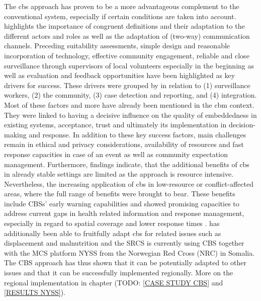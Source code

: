The \acrshort*{cbs} approach has proven to be a more advantageous complement to the conventional system, especially if certain conditions are taken into account. \autocite{gueninParticipatoryEpidemiologicalOne2022} highlights the importance of congruent definitions and their adaptation to the different actors and roles as well as the adaptation of (two-way) communication channels. Preceding suitability assessments, simple design and reasonable incorporation of technology, effective community engagement, reliable and close surveillance through supervisors of local volunteers especially in the beginning as well as evaluation and feedback opportunities have been highlighted as key drivers for success. These drivers were grouped by \autocite{mcgowanCommunitybasedSurveillanceInfectious2022} in relation to (1) surveillance workers, (2) the community, (3) case detection and reporting, and (4) integration. Most of these factors and more have already been mentioned in the \acrshort*{cbm} context. They were linked to having a decisive influence on the quality of embeddedness in existing systems, acceptance, trust and ultimately its implementation in decision-making and response. In addition to these key success factors, main challenges remain in ethical and privacy considerations, availability of resources and fast response capacities in case of an event as well as community expectation management. Furthermore, \autocite{boetzelaerEvaluationCommunityBased2020} findings indicate, that the additional benefits of \acrshort*{cbs} in already stable settings are limited as the approach is resource intensive. Nevertheless, the increasing application of \acrshort*{cbs} in low-resource or conflict-affected areas, where the full range of benefits were brought to bear. These benefits include CBSs' early warning capabilities and showed promising capacities to address current gaps in health related information and response management, especially in regard to spatial coverage and lower response times \autocite{metugeHumanitarianLedCommunitybased2021, ratnayakePeoplecentredSurveillanceNarrative2020}. \autocite{metugeHumanitarianLedCommunitybased2021} has additionally been able to fruitfully adapt \acrshort*{cbs} for related issues such as displacement and malnutrition and the SRCS is currently using CBS together with the MCS platform NYSS from the Norwegian Red Cross (NRC) in Somalia. The CBS approach has thus shown that it can be potentially adapted to other issues and that it can be successfully implemented regionally. More on the regional implementation in chapter (TODO: \ref*{CASE STUDY CBS} and \ref*{RESULTS NYSS}).

